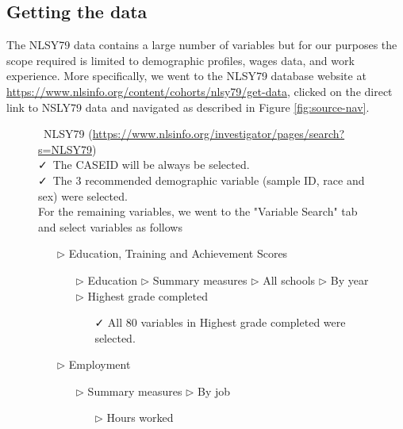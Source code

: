 \documentclass{article}
\begin{document}
\hypertarget{getdata}{%
\subsection{Getting the data}\label{getdata}}

The NLSY79 data contains a large number of variables but for our purposes the scope required is limited to demographic profiles, wages data, and work experience. More specifically, we went to the NLSY79 database website at \url{https://www.nlsinfo.org/content/cohorts/nlsy79/get-data}, clicked on the direct link to NSLY79 data and navigated as described in Figure \ref{fig:source-nav}.

\begin{figure}[t]

\begin{tcolorbox}[title = Navigating the data source]
\faDatabase\ NLSY79 (\url{https://www.nlsinfo.org/investigator/pages/search?s=NLSY79})\\
\vspace{1mm}
\faCheck\ The CASEID will be always be selected.  \\
\vspace{1mm}
\faCheck\ The 3 recommended demographic variable (sample ID, race and sex) were selected.  \\
\vspace{1mm}
For the remaining variables, we went to the "Variable Search" tab and select variables as follows
\begin{itemize}
\item[$\triangleright$] Education, Training and Achievement Scores
\begin{itemize}
\item[$\triangleright$] Education $\triangleright$ Summary measures $\triangleright$ All schools $\triangleright$ By year $\triangleright$ Highest grade completed
\begin{itemize}
\item[\faCheck] All 80 variables in Highest grade completed were selected.
\end{itemize}
\end{itemize}
\item[$\triangleright$] Employment
\begin{itemize}
\item[$\triangleright$] Summary measures $\triangleright$ By job
\begin{itemize}
\item[$\triangleright$] Hours worked  
\begin{itemize}

\end{itemize}
\end{itemize}
\end{itemize}
\end{itemize}
\end{tcolorbox}
\end{figure}
\end{document}

